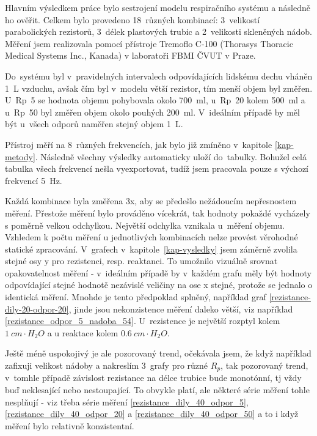 
Hlavním výsledkem práce bylo sestrojení modelu respiračního systému a následně ho ověřit. Celkem bylo provedeno 18~různých kombinací: 3~velikostí parabolických rezistorů, 3~délek plastových trubic a 2~velikosti skleněných nádob. Měření jsem realizovala pomocí přístroje Tremoflo C-100 (Thorasys Thoracic Medical Systems Inc., Kanada) v laboratoři FBMI ČVUT v Praze. 


Do~systému byl v~pravidelných intervalech odpovídajících lidskému dechu vháněn \SI{1}{L} vzduchu, avšak čím byl v~modelu větší rezistor, tím menší objem byl změřen. U~Rp~5 se hodnota objemu pohybovala okolo  \SI{700}{ml}, u~Rp~20 kolem  \SI{500}{ml} a u~Rp~50 byl změřen objem okolo pouhých \SI{200}{ml}. V~ideálním případě by měl být u~všech odporů naměřen stejný objem \SI{1}{L}.

Přístroj měří na 8~různých frekvencích, jak bylo již zmíněno v~kapitole \ref{kap-metody}. Následně všechny výsledky automaticky uloží do~tabulky. 
Bohužel celá tabulka všech frekvencí nešla vyexportovat, tudíž jsem pracovala pouze s výchozí frekvencí  \SI{5}{Hz}. 

Každá kombinace byla změřena 3x, aby se předešlo nežádoucím nepřesnostem měření. Přestože měření bylo prováděno vícekrát, tak hodnoty pokaždé vycházely s poměrně velkou odchylkou. Největší odchylka vznikala u~měření objemu.  Vzhledem k počtu měření u jednotlivých kombinacích nelze provést věrohodné statické zpracování.
V~grafech v~kapitole~\ref{kap-vysledky} jsem záměrně zvolila stejné osy y pro rezistenci, resp. reaktanci. To umožnilo vizuálně srovnat opakovatelnost měření -  v~ideálním případě by v~každém grafu měly být hodnoty odpovídající stejné hodnotě nezávislé veličiny na ose x stejné, protože se jednalo o identická měření. Mnohde je tento předpoklad splněný, například graf \ref{rezistance-dily-20-odpor-20}, jinde jsou nekonzistence měření daleko větší, viz například \ref{rezistance_odpor_5_nadoba_54}.
U~rezistence je největší rozptyl kolem $\SI{1}{ cm\cdot H_{2}O}$ a u reaktace kolem $\SI{0,6}{ cm\cdot H_{2}O}$. 


Ještě méně uspokojivý je ale pozorovaný trend, očekávala jsem, že když například zafixuji velikost nádoby a nakreslím 3~grafy pro různé $R_p$, tak pozorovaný trend, v~tomhle případě závislost rezistance na délce trubice bude monotónní, tj vždy buď neklesající nebo nestoupající. To obvykle platí, ale některé série měření tohle nesplňují - viz třeba série měření
\ref{rezistance_dily_40_odpor_5}, \ref{rezistance_dily_40_odpor_20} a \ref{rezistance_dily_40_odpor_50} a to i když měření bylo relativně konzistentní.


